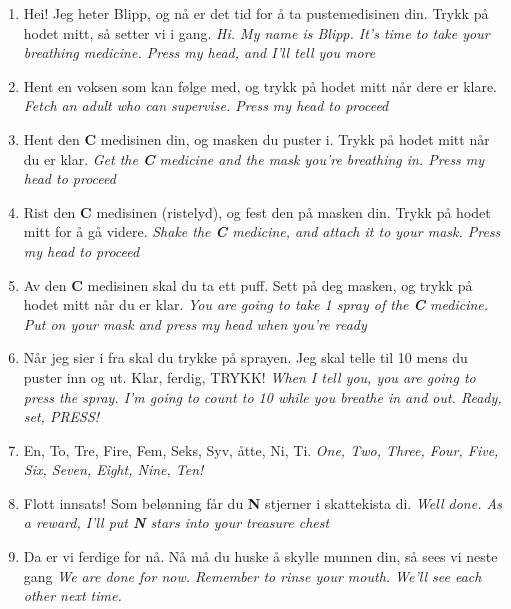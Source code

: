 \begin{enumerate}
  \item Hei! Jeg heter Blipp, og n\r{a} er det tid for \r{a} ta pustemedisinen din. Trykk p\r{a} hodet mitt, s\r{a} setter vi i gang. \emph{Hi. My name is Blipp. It's time to take your breathing medicine. Press my head, and I'll tell you more} 
  \item Hent en voksen som kan f\o lge med, og trykk p\r{a} hodet mitt n\r{a}r dere er klare. \emph{Fetch an adult who can supervise. Press my head to proceed}
  \item Hent den \textbf{C} medisinen din, og masken du puster i. Trykk p\r{a} hodet mitt n\r{a}r du er klar. \emph{Get the \textbf{C} medicine and the mask you're breathing in. Press my head to proceed}
  \item Rist den \textbf{C} medisinen (ristelyd), og fest den p\r{a} masken din. Trykk p\r{a} hodet mitt for \r{a} g\r{a} videre. \emph{Shake the \textbf{C} medicine, and attach it to your mask. Press my head to proceed}
  \item Av den \textbf{C} medisinen skal du ta ett puff. Sett p\r{a} deg masken, og trykk p\r{a} hodet mitt n\r{a}r du er klar. \emph{You are going to take 1 spray of the \textbf{C} medicine. Put on your mask and press my head when you're ready}
  \item N\r{a}r jeg sier i fra skal du trykke p\r{a} sprayen. Jeg skal telle til 10 mens du puster inn og ut. Klar, ferdig, TRYKK! \emph{When I tell you, you are going to press the spray. I'm going to count to 10 while you breathe in and out. Ready, set, PRESS!}
  \item En, To, Tre, Fire, Fem, Seks, Syv, \r{a}tte, Ni, Ti. \emph{One, Two, Three, Four, Five, Six, Seven, Eight, Nine, Ten!}
  \item Flott innsats! Som bel\o nning f\r{a}r du \textbf{N} stjerner i skattekista di. \emph{Well done. As a reward, I'll put \textbf{N} stars into your treasure chest} 
  \item Da er vi ferdige for n\r{a}. N\r{a} m\r{a} du huske \r{a} skylle munnen din, s\r{a} sees vi neste gang \emph{We are done for now. Remember to rinse your mouth. We'll see each other next time.}
\end{enumerate}

 
